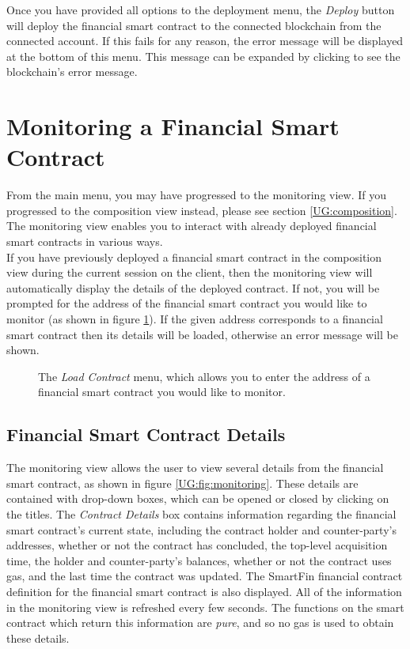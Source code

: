 \documentclass{article}
\begin{document}
Once you have provided all options to the deployment menu, the \textit{Deploy} button will deploy the financial smart contract to the connected blockchain from the connected account. If this fails for any reason, the error message will be displayed at the bottom of this menu. This message can be expanded by clicking to see the blockchain's error message.


\section{Monitoring a Financial Smart Contract} \label{UG:monitoring}

From the main menu, you may have progressed to the monitoring view. If you progressed to the composition view instead, please see section \ref{UG:composition}. The monitoring view enables you to interact with already deployed financial smart contracts in various ways. \\

If you have previously deployed a financial smart contract in the composition view during the current session on the client, then the monitoring view will automatically display the details of the deployed contract. If not, you will be prompted for the address of the financial smart contract you would like to monitor (as shown in figure \ref{UG:fig:monitoring-load}). If the given address corresponds to a financial smart contract then its details will be loaded, otherwise an error message will be shown.

\begin{figure}[h]
    \centering
    \caption{The \textit{Load Contract} menu, which allows you to enter the address of a financial smart contract you would like to monitor.}
    \label{UG:fig:monitoring-load}
\end{figure}

\subsection{Financial Smart Contract Details}

The monitoring view allows the user to view several details from the financial smart contract, as shown in figure \ref{UG:fig:monitoring}. These details are contained with drop-down boxes, which can be opened or closed by clicking on the titles. The \textit{Contract Details} box contains information regarding the financial smart contract's current state, including the contract holder and counter-party's addresses, whether or not the contract has concluded, the top-level acquisition time, the holder and counter-party's balances, whether or not the contract uses gas, and the last time the contract was updated. The SmartFin financial contract definition for the financial smart contract is also displayed. All of the information in the monitoring view is refreshed every few seconds. The functions on the smart contract which return this information are \textit{pure}, and so no gas is used to obtain these details.
\end{document}
